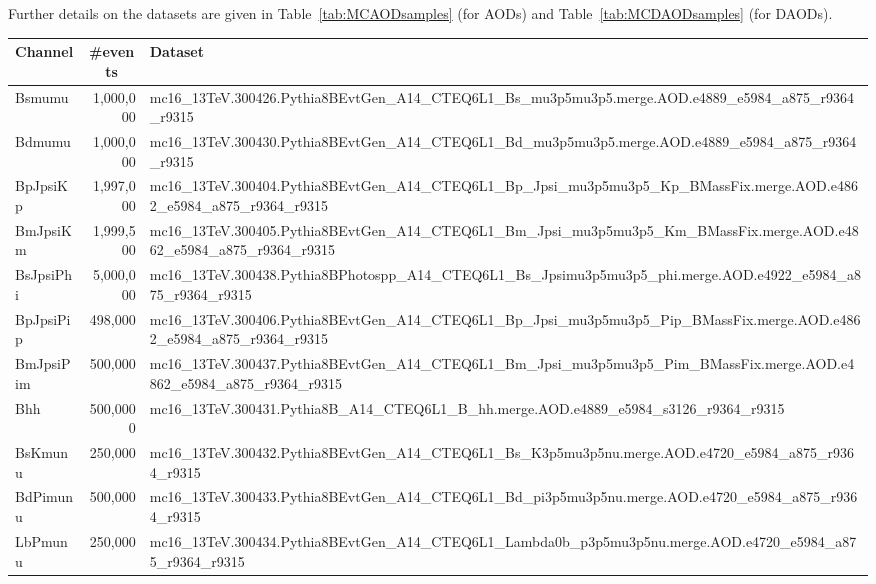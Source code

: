 Further details on the datasets are given
in Table~\ref{tab:MCAODsamples} (for AODs) and Table~\ref{tab:MCDAODsamples}
(for DAODs). 

\begin{table}[h]
  \centering
  \footnotesize
  \begin{adjustbox}{angle=90}
    \begin{tabular}{|l|r|l|}
      \hline
      Channel & \multicolumn{1}{|c|}{\#events}  & Dataset \\
      \hline
      Bsmumu & 1,000,000 &
    mc16\_13TeV.300426.Pythia8BEvtGen\_A14\_CTEQ6L1\_Bs\_mu3p5mu3p5.merge.AOD.e4889\_e5984\_a875\_r9364\_r9315 \\ 
Bdmumu  &  1,000,000 &
mc16\_13TeV.300430.Pythia8BEvtGen\_A14\_CTEQ6L1\_Bd\_mu3p5mu3p5.merge.AOD.e4889\_e5984\_a875\_r9364\_r9315
\\
BpJpsiKp	  &  1,997,000 & mc16\_13TeV.300404.Pythia8BEvtGen\_A14\_CTEQ6L1\_Bp\_Jpsi\_mu3p5mu3p5\_Kp\_BMassFix.merge.AOD.e4862\_e5984\_a875\_r9364\_r9315 \\
BmJpsiKm  &  1,999,500 &
mc16\_13TeV.300405.Pythia8BEvtGen\_A14\_CTEQ6L1\_Bm\_Jpsi\_mu3p5mu3p5\_Km\_BMassFix.merge.AOD.e4862\_e5984\_a875\_r9364\_r9315
\\
BsJpsiPhi  &  5,000,000 &
mc16\_13TeV.300438.Pythia8BPhotospp\_A14\_CTEQ6L1\_Bs\_Jpsimu3p5mu3p5\_phi.merge.AOD.e4922\_e5984\_a875\_r9364\_r9315 \\
BpJpsiPip  &  498,000 &
mc16\_13TeV.300406.Pythia8BEvtGen\_A14\_CTEQ6L1\_Bp\_Jpsi\_mu3p5mu3p5\_Pip\_BMassFix.merge.AOD.e4862\_e5984\_a875\_r9364\_r9315 \\
BmJpsiPim  &  500,000 & mc16\_13TeV.300437.Pythia8BEvtGen\_A14\_CTEQ6L1\_Bm\_Jpsi\_mu3p5mu3p5\_Pim\_BMassFix.merge.AOD.e4862\_e5984\_a875\_r9364\_r9315  \\
Bhh  &  500,0000 &
mc16\_13TeV.300431.Pythia8B\_A14\_CTEQ6L1\_B\_hh.merge.AOD.e4889\_e5984\_s3126\_r9364\_r9315
\\
BsKmunu  &  250,000 &
mc16\_13TeV.300432.Pythia8BEvtGen\_A14\_CTEQ6L1\_Bs\_K3p5mu3p5nu.merge.AOD.e4720\_e5984\_a875\_r9364\_r9315
\\
BdPimunu  &  500,000 &
mc16\_13TeV.300433.Pythia8BEvtGen\_A14\_CTEQ6L1\_Bd\_pi3p5mu3p5nu.merge.AOD.e4720\_e5984\_a875\_r9364\_r9315 \\
LbPmunu  &  250,000 & mc16\_13TeV.300434.Pythia8BEvtGen\_A14\_CTEQ6L1\_Lambda0b\_p3p5mu3p5nu.merge.AOD.e4720\_e5984\_a875\_r9364\_r9315 \\

\end{tabular}
\end{adjustbox}
\end{table}
